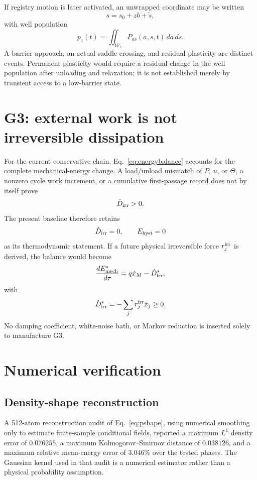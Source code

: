 \documentclass[11pt]{article}
\begin{document}
If registry motion is later activated, an unwrapped coordinate may be written
\begin{equation}
s=s_0+zb+\widetilde s,
\end{equation}
with well population
\begin{equation}
p_z(t)=\iint_{\mathcal W_z}P_{as}(a,s,t)\,da\,ds.
\end{equation}
A barrier approach, an actual saddle crossing, and residual plasticity are distinct events. Permanent plasticity would require a residual change in the well population after unloading and relaxation; it is not established merely by transient access to a low-barrier state.

\section{G3: external work is not irreversible dissipation}
For the current conservative chain, Eq.~\eqref{eq:energybalance} accounts for the complete mechanical-energy change. A load/unload mismatch of \(P\), \(u\), or \(\Theta\), a nonzero cycle work increment, or a cumulative first-passage record does not by itself prove
\begin{equation}
\dot D_{\rm irr}>0.
\end{equation}
The present baseline therefore retains
\begin{equation}
\dot D_{\rm irr}=0,
\qquad
E_{\rm hyst}=0
\end{equation}
as its thermodynamic statement. If a future physical irreversible force \(r_j^{\rm irr}\) is derived, the balance would become
\begin{equation}
\frac{dE_{\rm mech}^*}{d\tau}
=q\dot x_M-\dot D_{\rm irr}^*,
\end{equation}
with
\begin{equation}
\dot D_{\rm irr}^*
=-\sum_j r_j^{\rm irr}\dot x_j\ge0.
\end{equation}
No damping coefficient, white-noise bath, or Markov reduction is inserted solely to manufacture G3.

\section{Numerical verification}
\subsection{Density-shape reconstruction}
A 512-atom reconstruction audit of Eq.~\eqref{eq:pshape}, using numerical smoothing only to estimate finite-sample conditional fields, reported a maximum \(L^1\) density error of \(0.076255\), a maximum Kolmogorov--Smirnov distance of \(0.038126\), and a maximum relative mean-energy error of \(3.046\%\) over the tested phases. The Gaussian kernel used in that audit is a numerical estimator rather than a physical probability assumption.
\end{document}
